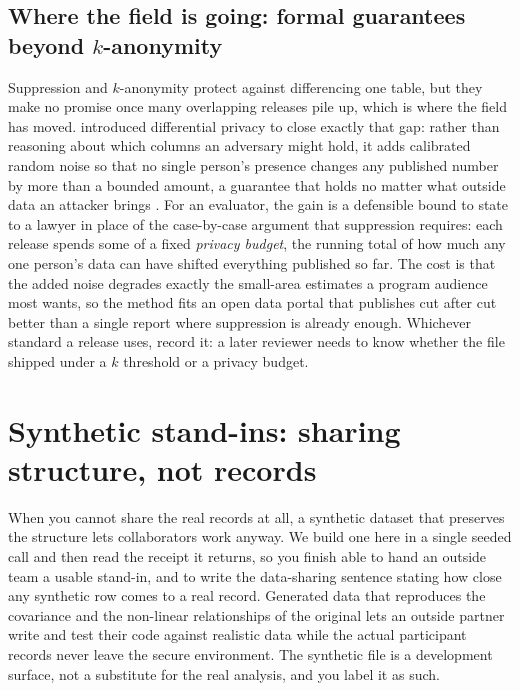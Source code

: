 \documentclass[
    a4paper,
    fontsize=10pt,
    twoside=true,
    numbers=noenddot,
]{kaobook}
\begin{document}
\subsection{Where the field is going: formal guarantees beyond \texorpdfstring{$k$}{k}-anonymity}\label{sec:frontier-dp}
Suppression and $k$-anonymity protect against differencing one table, but they make no promise once many overlapping releases pile up, which is where the field has moved. \textcite{dwork2006diffpriv} introduced differential privacy to close exactly that gap: rather than reasoning about which columns an adversary might hold, it adds calibrated random noise so that no single person's presence changes any published number by more than a bounded amount, a guarantee that holds no matter what outside data an attacker brings \parencite{dworkroth2014found}.  For an evaluator, the gain is a defensible bound to state to a lawyer in place of the case-by-case argument that suppression requires: each release spends some of a fixed \emph{privacy budget}, the running total of how much any one person's data can have shifted everything published so far. The cost is that the added noise degrades exactly the small-area estimates a program audience most wants, so the method fits an open data portal that publishes cut after cut better than a single report where suppression is already enough. Whichever standard a release uses, record it: a later reviewer needs to know whether the file shipped under a $k$ threshold or a privacy budget.

\section{Synthetic stand-ins: sharing structure, not records}\label{sec:synth}
When you cannot share the real records at all, a synthetic dataset that preserves the structure lets collaborators work anyway. We build one here in a single seeded call and then read the receipt it returns, so you finish able to hand an outside team a usable stand-in, and to write the data-sharing sentence stating how close any synthetic row comes to a real record. Generated data that reproduces the covariance and the non-linear relationships of the original lets an outside partner write and test their code against realistic data while the actual participant records never leave the secure environment. The synthetic file is a development surface, not a substitute for the real analysis, and you label it as such.
\end{document}

